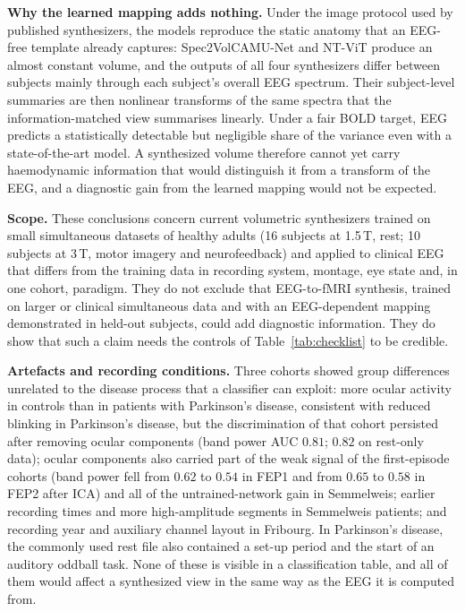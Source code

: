 \documentclass[pdflatex,referee,sn-basic]{sn-jnl}%
\begin{document}
\noindent\textbf{Why the learned mapping adds nothing.} Under the image protocol used by published synthesizers, the models reproduce the static anatomy that an EEG-free template already captures: Spec2VolCAMU-Net and NT-ViT produce an almost constant volume, and the outputs of all four synthesizers differ between subjects mainly through each subject's overall EEG spectrum. Their subject-level summaries are then nonlinear transforms of the same spectra that the information-matched view summarises linearly. Under a fair BOLD target, EEG predicts a statistically detectable but negligible share of the variance even with a state-of-the-art model. A synthesized volume therefore cannot yet carry haemodynamic information that would distinguish it from a transform of the EEG, and a diagnostic gain from the learned mapping would not be expected.

\noindent\textbf{Scope.} These conclusions concern current volumetric synthesizers trained on small simultaneous datasets of healthy adults (16 subjects at 1.5\,T, rest; 10 subjects at 3\,T, motor imagery and neurofeedback) and applied to clinical EEG that differs from the training data in recording system, montage, eye state and, in one cohort, paradigm. They do not exclude that EEG-to-fMRI synthesis, trained on larger or clinical simultaneous data and with an EEG-dependent mapping demonstrated in held-out subjects, could add diagnostic information. They do show that such a claim needs the controls of Table~\ref{tab:checklist} to be credible.

\noindent\textbf{Artefacts and recording conditions.} Three cohorts showed group differences unrelated to the disease process that a classifier can exploit: more ocular activity in controls than in patients with Parkinson's disease, consistent with reduced blinking in Parkinson's disease, but the discrimination of that cohort persisted after removing ocular components (band power AUC $0.81$; $0.82$ on rest-only data); ocular components also carried part of the weak signal of the first-episode cohorts (band power fell from $0.62$ to $0.54$ in FEP1 and from $0.65$ to $0.58$ in FEP2 after ICA) and all of the untrained-network gain in Semmelweis; earlier recording times and more high-amplitude segments in Semmelweis patients; and recording year and auxiliary channel layout in Fribourg. In Parkinson's disease, the commonly used rest file also contained a set-up period and the start of an auditory oddball task. None of these is visible in a classification table, and all of them would affect a synthesized view in the same way as the EEG it is computed from.
\end{document}
